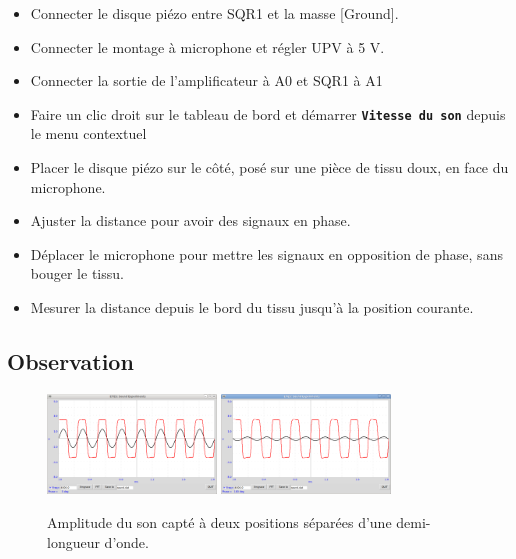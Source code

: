 \documentclass{book}
\newcommand{\nop}{}
\begin{document}
\begin{itemize}
  \item Connecter le disque piézo entre SQR1 et la masse [Ground].
  \item Connecter le montage à microphone et régler UPV à 5 V.
  \item Connecter la sortie de l'amplificateur à A0 et SQR1 à A1
  \item Faire un clic droit sur le tableau de bord et démarrer  \texttt{\textbf{Vitesse du son}\nop} depuis le menu contextuel
  \item Placer le disque piézo sur le côté, posé sur une pièce de tissu doux, en face du microphone.
  \item Ajuster la distance pour avoir des signaux en phase.
  \item Déplacer le microphone pour mettre les signaux en opposition de phase, sans bouger le tissu.
  \item Mesurer la distance depuis le bord du tissu jusqu'à la position courante.
\end{itemize}

\subsection{Observation}


\begin{figure}[h!]
\begin{center}
\caption{\label{fig:Sound-amplitude-captured}Amplitude du son capté à deux positions séparées d'une demi-longueur d'onde. }\vspace{0.5em}
\includegraphics[width=0.4\textwidth, height=0.3\textwidth, keepaspectratio]{Schematic-sound-inphase.png}
\includegraphics[width=0.4\textwidth, height=0.3\textwidth, keepaspectratio]{Pic-sound-outofphase.png}
\end{center}
\end{figure}
\end{document}
